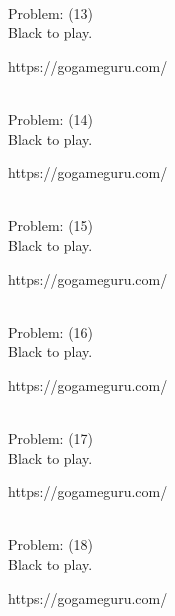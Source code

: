 \documentclass[11pt]{article}
\begin{document}
\begin{minipage}[t]{0.5\textwidth}
  {\centering
  
\\
  Problem: (13)\\
  Black to play.

https://gogameguru.com/\\
  }
\end{minipage}
\begin{minipage}[t]{0.5\textwidth}
  {\centering
  
\\
  Problem: (14)\\
  Black to play.

https://gogameguru.com/\\
  }
\end{minipage}
\begin{minipage}[t]{0.5\textwidth}
  {\centering
  
\\
  Problem: (15)\\
  Black to play.

https://gogameguru.com/\\
  }
\end{minipage}
\begin{minipage}[t]{0.5\textwidth}
  {\centering
  
\\
  Problem: (16)\\
  Black to play.

https://gogameguru.com/\\
  }
\end{minipage}
\begin{minipage}[t]{0.5\textwidth}
  {\centering
  
\\
  Problem: (17)\\
  Black to play.

https://gogameguru.com/\\
  }
\end{minipage}
\begin{minipage}[t]{0.5\textwidth}
  {\centering
  
\\
  Problem: (18)\\
  Black to play.

https://gogameguru.com/\\
  }
\end{minipage}
\end{document}
